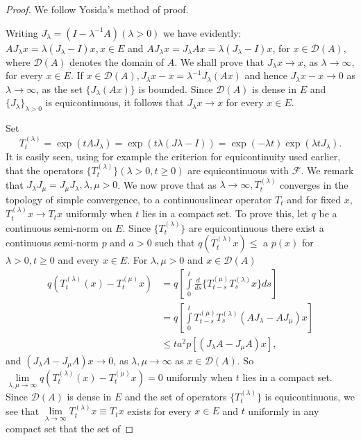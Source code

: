 \begin{proof}
We follow Yosida's method of proof.

Writing $J_\lambda =(I-\lambda^{-1}A)(\lambda >0)$ we have
evidently: $A J_\lambda x=\lambda(J_\lambda -I)x, x\in E$ and $A
J_\lambda x=J_\lambda A x=\lambda (J_\lambda -I)x$, for
$x\in\mathscr{D}(A)$, where $\mathscr{D}(A)$ denotes the domain of
$A$. We shall prove that $J_\lambda x\to x$, as $\lambda \to\infty$,
for every $x\in E$. If $x\in \mathscr{D}(A), J_\lambda
x-x=\lambda^{-1} J_\lambda(Ax)$ and hence $J_\lambda x-x\to 0$ as
$\lambda\to \infty$, as the set $\{J_\lambda(Ax)\}$ is bounded. Since
$\mathscr{D}(A)$ is dense in $E$ and $\{J_\lambda\}_{\lambda >0}$ is
equicontinuous, it follows that $J_\lambda x\to x$ for every $x\in E$.

Set
$$
T_t^{(\lambda)}=\exp (t A J_\lambda)=\exp (t\lambda (J\lambda -I))=\exp
(-\lambda t)\exp(\lambda t J_\lambda).
$$
It is easily seen, using for example the criterion for equicontinuity
used earlier, that the operators $\{T_t^{(\lambda)}\} (\lambda >0,
t\geq 0)$ are equicontinuous with $\mathscr{F}$. We remark that
$J_\lambda J_\mu = J_\mu J_\lambda, \lambda, \mu >0$. We now prove
that as $\lambda\to\infty, T_t^{(\lambda)}$ converges in the topology
of simple convergence, to a continuous\pageoriginale linear operator
$T_t$ and for fixed $x$, $T_t^{(\lambda)}x\to T_tx$ uniformly when $t$
lies in a compact set. To prove this, let $q$ be a continuous
semi-norm on $E$. Since $\{T_t^{(\lambda)}\}$ are equicontinuous there
exist a continuous semi-norm $p$ and $a>0$ such that
$q(T_t^{(\lambda)}x)\leq$ a $p(x)$ for $\lambda >0, t\geq 0$ and every
$x\in E$. For $\lambda, \mu >0$ and $x\in\mathscr{D}(A)$
\begin{align*}
q(T_t^{(\lambda)}(x)-T_t^{(\mu)}x) &=q \left[\int\limits_0^t
  \frac{d}{ds}\{T_{t-s}^{(\mu)} T_s^{(\lambda)}x\}ds\right]\\
&=q\left[\int\limits_0^t T_{t-s}^{(\mu)}T_s^{(\lambda)}(AJ_\lambda-AJ_\mu)x\right]\\
&\leq t a^2 p\left[(J_\lambda A-J_\mu A)x\right],
\end{align*}
and $(J_\lambda A-J_\mu A)x\to 0$, as $\lambda, \mu\to\infty$ as $x\in
\mathscr{D}(A)$. So $\lim\limits_{\lambda, \mu\to\infty}
q(T_t^{(\lambda)}(x)-T_t^{(\mu)}x)=0$ uniformly when $t$ lies in a
compact set. Since $\mathscr{D}(A)$ is dense in $E$ and the set of
operators $\{T_t^{(\lambda)}\}$ is equicontinuous, we see that
$\lim\limits_{\lambda\to\infty} T_t^{(\lambda)}x\equiv T_tx$ exists
for every $x\in E$ and $t$ uniformly in any compact set that the set of

\end{proof}
